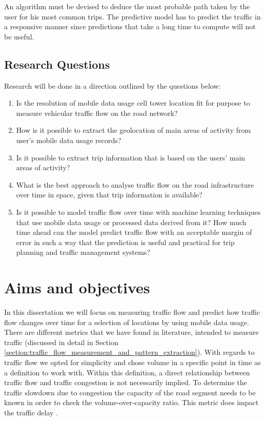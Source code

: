 \documentclass[12pt, a4paper]{report}
\theoremstyle{definition}
\theoremstyle{definition}%
\theoremstyle{definition}%
\theoremstyle{definition}%
\theoremstyle{definition}%
\theoremstyle{definition}%
\begin{document}
An algorithm must be devised to deduce the most probable path taken by the user for his most common trips. The predictive model has to predict the traffic in a responsive manner since predictions that take a long time to compute will not be useful.


\subsection{Research Questions}

Research will be done in a direction outlined by the questions below:
\begin{enumerate}
	\item Is the resolution of mobile data usage cell tower location fit for purpose to measure vehicular traffic flow on the road network?
	
	\item How is it possible to extract the geolocation of main areas of activity from user's mobile data usage records?
	
	\item Is it possible to extract trip information that is based on the users' main areas of activity?
	
	\item What is the best approach to analyse traffic flow on the road infrastructure over time in space, given that trip information is available? 

	\item Is it possible to model traffic flow over time with machine learning techniques that use mobile data usage or processed data derived from it? How much time ahead can the model predict traffic flow with an acceptable margin of error in such a way that the prediction is useful and practical for trip planning and traffic management systems?
\end{enumerate}




\section{Aims and objectives} \label{section:introduction:aims_objectives}

In this dissertation we will focus on measuring traffic flow and predict how traffic flow changes over time for a selection of locations by using mobile data usage. There are different metrics that we have found in literature, intended to measure traffic (discussed in detail in Section \ref{section:traffic_flow_measurement_and_pattern_extraction}).  With regards to traffic flow we opted for simplicity and chose volume in a specific point in time as a definition to work with. Within this definition, a direct relationship between traffic flow and traffic congestion is not necessarily implied. To determine the traffic slowdown due to congestion the capacity of the road segment needs to be known in order to check the volume-over-capacity ratio. This metric does impact the traffic delay \cite{Toole2015}. 
\end{document}
